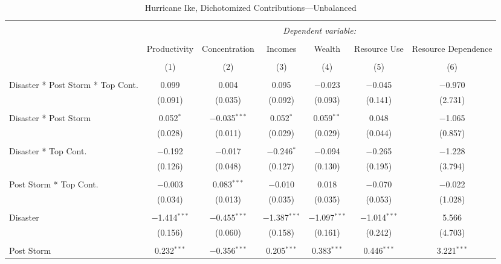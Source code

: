 
\begin{table}[!htbp] \centering 
  \caption{Hurricane Ike, Dichotomized Contributions---Unbalanced} 
  \label{} 
\footnotesize 
\begin{tabular}{@{\extracolsep{5pt}}lcccccc} 
\\[-1.8ex]\hline 
\hline \\[-1.8ex] 
 & \multicolumn{6}{c}{\textit{Dependent variable:}} \\ 
\cline{2-7} 
\\[-1.8ex] & Productivity & Concentration & Incomes & Wealth & Resource Use & Resource Dependence \\ 
\\[-1.8ex] & (1) & (2) & (3) & (4) & (5) & (6)\\ 
\hline \\[-1.8ex] 
 Disaster * Post Storm * Top Cont. & 0.099 & 0.004 & 0.095 & $-$0.023 & $-$0.045 & $-$0.970 \\ 
  & (0.091) & (0.035) & (0.092) & (0.093) & (0.141) & (2.731) \\ 
  & & & & & & \\ 
 Disaster * Post Storm & 0.052$^{*}$ & $-$0.035$^{***}$ & 0.052$^{*}$ & 0.059$^{**}$ & 0.048 & $-$1.065 \\ 
  & (0.028) & (0.011) & (0.029) & (0.029) & (0.044) & (0.857) \\ 
  & & & & & & \\ 
 Disaster * Top Cont. & $-$0.192 & $-$0.017 & $-$0.246$^{*}$ & $-$0.094 & $-$0.265 & $-$1.228 \\ 
  & (0.126) & (0.048) & (0.127) & (0.130) & (0.195) & (3.794) \\ 
  & & & & & & \\ 
 Post Storm *  Top Cont. & $-$0.003 & 0.083$^{***}$ & $-$0.010 & 0.018 & $-$0.070 & $-$0.022 \\ 
  & (0.034) & (0.013) & (0.035) & (0.035) & (0.053) & (1.028) \\ 
  & & & & & & \\ 
 Disaster & $-$1.414$^{***}$ & $-$0.455$^{***}$ & $-$1.387$^{***}$ & $-$1.097$^{***}$ & $-$1.014$^{***}$ & 5.566 \\ 
  & (0.156) & (0.060) & (0.158) & (0.161) & (0.242) & (4.703) \\ 
  & & & & & & \\ 
 Post Storm & 0.232$^{***}$ & $-$0.356$^{***}$ & 0.205$^{***}$ & 0.383$^{***}$ & 0.446$^{***}$ & 3.221$^{***}$ \\ 

\end{tabular}
\end{table}
